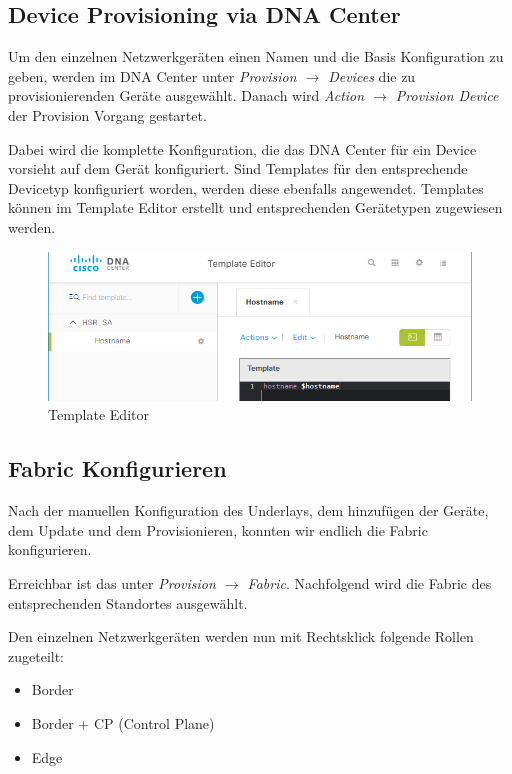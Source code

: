 \subsection{Device Provisioning via DNA Center}
\label{device-provisioning}
Um den einzelnen Netzwerkgeräten einen Namen und die Basis Konfiguration zu geben, werden im DNA Center unter \textit{Provision $\rightarrow$ Devices} die zu provisionierenden Geräte ausgewählt. Danach wird \textit{Action $\rightarrow$ Provision Device} der Provision Vorgang gestartet.

Dabei wird die komplette Konfiguration, die das DNA Center für ein Device vorsieht auf dem Gerät konfiguriert. Sind Templates für den entsprechende Devicetyp konfiguriert worden, werden diese ebenfalls angewendet.
Templates können im Template Editor erstellt und entsprechenden Gerätetypen zugewiesen werden.

\begin{figure}[H]
	\centering
	\includegraphics[width=12cm]{img/templateeditor.png}
	\caption{Template Editor}
	\label{fig:Template Editor}
\end{figure}


\subsection{Fabric Konfigurieren}
\label{fabric-configuration}
Nach der manuellen Konfiguration des Underlays, dem hinzufügen der Geräte, dem Update und dem Provisionieren, konnten wir endlich die Fabric konfigurieren. 

Erreichbar ist das unter \textit{Provision $\rightarrow$ Fabric}. Nachfolgend wird die Fabric des entsprechenden Standortes ausgewählt.

Den einzelnen Netzwerkgeräten werden nun mit Rechtsklick folgende Rollen zugeteilt:
\begin{itemize}
	\item Border
	\item Border + CP (Control Plane)
	\item Edge
\end{itemize}

